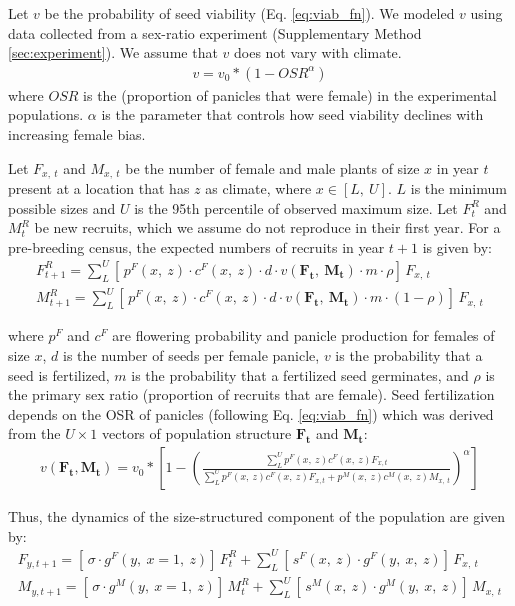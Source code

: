 \documentclass[12pt]{article}
\begin{document}
Let $v$ be the probability of seed viability (Eq. \ref{eq:viab_fn}). 
We modeled  $v$ using data collected from a sex-ratio experiment (Supplementary Method \ref{sec:experiment}).
We assume that $v$ does not vary with climate.  
\begin{align}\label{eq:viab_fn}
v = v_{0} * (1 - OSR^{\alpha})
\end{align}
\noindent where $OSR$ is the (proportion of panicles that were female) in the experimental populations.
$\alpha$ is the parameter that controls how seed viability declines with increasing female bias.

Let $F_{x,\ t}$ and $M_{x,\ t}$ be the number of female and male plants of size $x$ in year $t$ present at a location that has $z$ as climate, where $x \in [L,\ U]$.
$L$ is the minimum possible sizes and $U$ is the 95th percentile of observed maximum size.
Let $F^{R}_{t}$ and $M^{R}_{t}$ be new recruits, which we assume do not reproduce in their first year.
For a pre-breeding census, the expected numbers of recruits in year $t+1$ is given by:
\begin{align}\label{eq:recruits}
F^{R}_{t+1} = \sum_{L}^{U} 	[ \, p^{F}(x,\ z) \cdot c^{F}(x,\ z) \cdot d \cdot v(\mathbf{F_{t}},\ \mathbf{M_{t}}) \cdot m \cdot \rho 	] \, F_{x,\ t}
\\
M^{R}_{t+1} = \sum_{L}^{U} 	[ \, p^{F}(x,\ z) \cdot c^{F}(x,\ z) \cdot d \cdot v(\mathbf{F_{t}},\ \mathbf{M_{t}}) \cdot m \cdot (1-\rho) 	] \, F_{x,\ t}
\end{align}

\noindent where $p^{F}$ and $c^{F}$ are flowering probability and panicle production for females of size $x$, $d$ is the number of seeds per female panicle, $v$ is the probability that a seed is fertilized, $m$ is the probability that a fertilized seed germinates, and $\rho$ is the primary sex ratio (proportion of recruits that are female). 
Seed fertilization depends on the OSR of panicles (following Eq. \ref{eq:viab_fn}) which was derived from the $U \times 1$ vectors of population structure $\mathbf{F_{t}}$ and $\mathbf{M_{t}}$:
\begin{align}\label{eq:viab_MPM}
v(\mathbf{F_{t}},\mathbf{M_{t}}) = v_{0} * \left[ 1 - \left( \frac{\sum_{L}^{U} p^{F}(x,\ z) c^{F}(x,\ z) F_{x,t}}{\sum_{L}^{U} p^{F}(x,\ z) c^{F}(x,\ z) F_{x,t} + p^{M}(x,\ z) c^{M}(x,\ z) M_{x,\ t}} \right) ^{\alpha}\right]
\end{align}

Thus, the dynamics of the size-structured component of the population are given by:
\begin{align}\label{eq:dynamics}
F_{y,t+1} = [ \, \sigma \cdot g^{F}(y,\ x=1,\ z) ] \, F^{R}_{t} + \sum_{L}^{U} 	[ \, s^{F}(x,\ z) \cdot g^{F}(y,\ x,\ z)] \, F_{x,\ t}
\\
M_{y,t+1} = [ \, \sigma \cdot g^{M}(y,\ x=1,\ z) ] \, M^{R}_{t} + \sum_{L}^{U} 	[ \,  s^{M}(x,\ z) \cdot g^{M}(y,\ x,\ z) ] \, M_{x,\ t}
\end{align}
\end{document}
